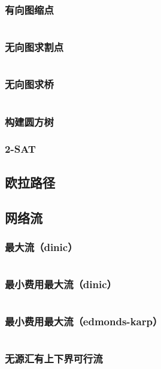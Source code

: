 \documentclass[10pt, a4paper, oneside]{ctexart}
\begin{document}
\begin{multicols}{2}
        \subsubsection{有向图缩点}
        \inputminted{cpp}{src/graph/tarjan-directed.cpp}
        \subsubsection{无向图求割点}
        \inputminted{cpp}{src/graph/tarjan-vertex.cpp}
        \subsubsection{无向图求桥}
        \inputminted{cpp}{src/graph/tarjan-edge.cpp}
        \subsubsection{构建圆方树}
        
        \subsubsection{2-SAT}
        
        \subsection{欧拉路径}
        
        \subsection{网络流}
        \subsubsection{最大流（dinic）}
        \inputminted{cpp}{src/graph/dinic.cpp}
        \subsubsection{最小费用最大流（dinic）}
        \inputminted{cpp}{src/graph/mcmf-dinic.cpp}
        \subsubsection{最小费用最大流（edmonds-karp）}
        \inputminted{cpp}{src/graph/mcmf-ek.cpp}
        \subsubsection{无源汇有上下界可行流}
        \inputminted{cpp}{src/graph/feasible-bounded-flow.cpp}

\end{multicols}
\end{document}
